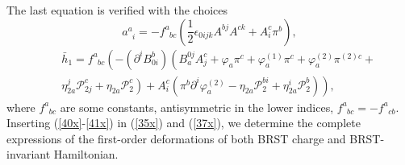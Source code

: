 \documentclass[a4paper,12pt]{article}
\begin{document}
The last equation is verified with the choices 
\begin{equation}
a_{\;\;i}^{a}=-f_{\;\;bc}^{a}\left( \frac{1}{2}\epsilon
_{0ijk}A^{bj}A^{ck}+A_{i}^{c}\pi ^{b}\right) ,  \label{40x}
\end{equation}
\begin{eqnarray}
&&\bar{h}_{1}=f_{\;\;bc}^{a}\left( -\left( \partial ^{i}B_{0i}^{b}\right)
\left( B_{a}^{0j}A_{j}^{c}+\varphi _{a}\pi ^{c}+\varphi _{a}^{\left(
1\right) }\pi ^{c}+\varphi _{a}^{\left( 2\right) }\pi ^{\left( 2\right)
c}+\right. \right.  \nonumber \\
&&\left. \left. \eta _{2a}^{j}\mathcal{P}_{2j}^{c}+\eta _{2a}\mathcal{P}%
_{2}^{c}\right) +A_{i}^{c}\left( \pi ^{b}\partial ^{i}\varphi _{a}^{\left(
2\right) }-\eta _{2a}\mathcal{P}_{2}^{bi}+\eta _{2a}^{i}\mathcal{P}%
_{2}^{b}\right) \right) ,  \label{41x}
\end{eqnarray}
where $f_{\;\;bc}^{a}$ are some constants, antisymmetric in the lower
indices, $f_{\;\;bc}^{a}=-f_{\;\;cb}^{a}$. Inserting (\ref{40x}-\ref{41x})
in (\ref{35x}) and (\ref{37x}), we determine the complete expressions of the
first-order deformations of both BRST charge and BRST-invariant Hamiltonian.
\end{document}

